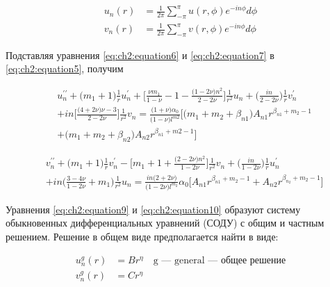 \begin{equation}
\label{eq:ch2:equation8}
\begin{split}
	u_n(r) &= \frac{1}{2\pi} \sum_{-\pi}^{\pi} u(r, \phi) e^{-in\phi} d\phi\\
	v_n(r) &= \frac{1}{2\pi} \sum_{-\pi}^{\pi} v(r, \phi) e^{-in\phi} d\phi
\end{split}
\end{equation}

Подставляя уравнения \cref{eq:ch2:equation6} и \cref{eq:ch2:equation7} в \cref{eq:ch2:equation5}, получим

\begin{equation}
\label{eq:ch2:equation9}
\begin{split}
	&u_n^{\prime\prime} + \big ( m_1 + 1 \big ) \frac{1}{r} u_n^{\prime} + \big [ \frac{\nu m_1}{1-\nu} -1 - \frac{\big ( 1 - 2\nu \big )n^2}{2-2\nu} \big ] \frac{1}{r^2}u_n + \big(\frac{in}{2-2\nu} \big)\frac{1}{r}v_n^{\prime}\\
&+in \big [ \frac{ \big (4+2\nu \big )\nu -3}{2-2\nu}\big ]\frac{1}{r^2}v_n = \frac{\big (1+\nu \big ) \alpha_0}{\big (1-\nu \big )l^{m2}} \big [ \big (m_1 + m_2 +\beta_{n1} \big )A_{n1} r^{\beta_{n1}+m_2-1} \\
&+ \big(m_1 +m_2 + \beta_{n2} \big ) A_{n2} r^{\beta_{n1}+m2-1} \big ]
\end{split}
\end{equation}

\begin{equation}
\label{eq:ch2:equation10}
\begin{split}
	&v_n^{\prime\prime} + \big ( m_1 + 1 \big ) \frac{1}{r} v_n^{\prime} - \big [ m_1 + 1 + \frac{\big (2-2\nu \big )n^2}{1-2\nu} \big ] \frac{1}{r^2}v_n + \big(\frac{in}{1-2\nu} \big)\frac{1}{r}u_n^{\prime}\\
&+ in \big (\frac{3-4\nu}{1-2\nu} + m_1 \big ) \frac{1}{r^2} u_n = \frac{in \big (2+2\nu \big)}{\big (1-2\nu \big) l^{m_2}} \alpha_0 \big [ A_{n1} r^{\beta_{n1}+m_2-1} + A_{n2} r^{\beta_{n_2}+m_2 -1}\big ]
\end{split}
\end{equation}

Уравнения \cref{eq:ch2:equation9} и \cref{eq:ch2:equation10} образуют систему обыкновенных дифференциальных уравнений (СОДУ) с общим и частным решением. Решение в общем виде предполагается найти в виде:

\begin{equation}
\label{eq:ch2:equation11}
\begin{split}
	u_n^g(r) &= Br^{\eta} \quad \text{g --- general --- общее решение}\\
	v_n^g(r) &= Cr^{\eta}
\end{split}
\end{equation}

